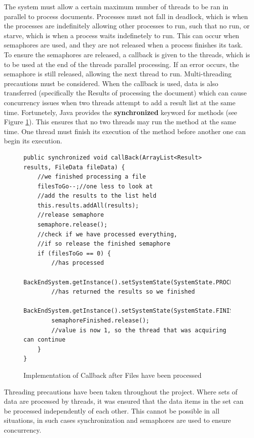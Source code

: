 \par The system must allow a certain maximum number of threads to be ran in parallel to process documents. Processes must not fall in deadlock, which is when the processes are indefinitely allowing other processes to run, such that no run, or starve, which is when a process waits indefinetely to run. This can occur when semaphores are used, and they are not released when a process finishes its task. To ensure the semaphores are released, a callback is given to the threads, which is to be used at the end of the threads parallel processing. If an error occurs, the semaphore is still released, allowing the next thread to run. Multi-threading precautions must be considered. When the callback is used, data is also transferred (specifically the Results of processing the document) which can cause concurrency issues when two threads attempt to add a result list at the same time. Fortunetely, Java provides the \textbf{synchronized} keyword for methods (see Figure \ref{fig:callbackFilesImplemented}). This ensures that no two threads may run the method at the same time. One thread must finish its execution of the method before another one can begin its execution.

\begin{figure}[H]
\begin{lstlisting}
public synchronized void callBack(ArrayList<Result> results, FileData fileData) {
    //we finished processing a file
    filesToGo--;//one less to look at
    //add the results to the list held
    this.results.addAll(results);
    //release semaphore
    semaphore.release();
    //check if we have processed everything, 
    //if so release the finished semaphore
    if (filesToGo == 0) {
        //has processed
        BackEndSystem.getInstance().setSystemState(SystemState.PROCESSED);
        //has returned the results so we finished
        BackEndSystem.getInstance().setSystemState(SystemState.FINISHED);
        semaphoreFinished.release();
	    //value is now 1, so the thread that was acquiring can continue
    }
}
\end{lstlisting}
\caption{Implementation of Callback after Files have been processed}
\label{fig:callbackFilesImplemented}
\end{figure}

\par Threading precautions have been taken throughout the project. Where sets of data are processed by threads, it was ensured that the data items in the set can be processed independently of each other. This cannot be possible in all situations, in such cases synchronization and semaphores are used to ensure concurrency.

